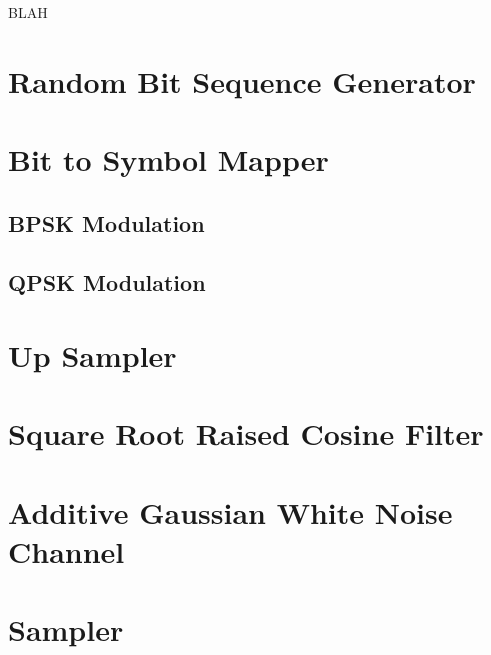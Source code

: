 \documentclass[]{article}
\begin{document}
BLAH

\appendix
\newpage


\newpage
%

\section{Random Bit Sequence Generator}
\label{app:random_bit_generator}


\section{Bit to Symbol Mapper}
\label{app:bittosym}
\subsection{BPSK Modulation}
\label{app:bpsk_mod}


\subsection{QPSK Modulation}
\label{app:qpsk_mod}


\section{Up Sampler}
\label{app:impulse_train}


\section{Square Root Raised Cosine Filter}
\label{app:sqrt_raised_cosine}


\section{Additive Gaussian White Noise Channel}
\label{app:awgn_channel}


\section{Sampler}
\label{app:sampler}

\end{document}
